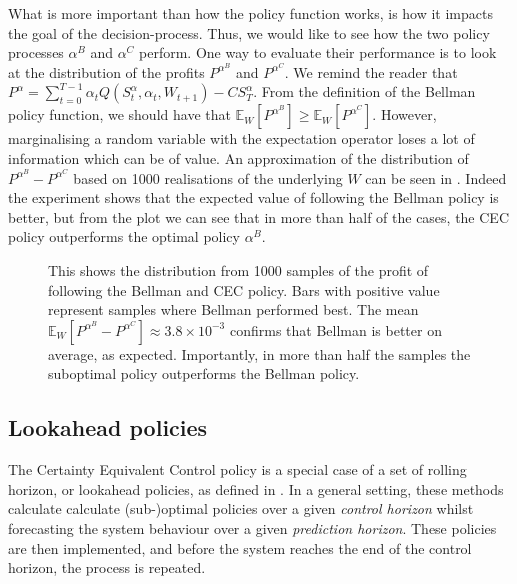 \documentclass[main.tex]{subfiles}
\begin{document}
What is more important than how the policy function works, is how it
impacts the goal of the decision-process. Thus, we would like to see
how the two policy processes $\alpha^B$ and $\alpha^C$ perform.
One way to evaluate their performance is to look at
the distribution of the profits $P^{\alpha^B}$ and $P^{\alpha^C}$.
We remind the reader that
$P^\alpha =
\sum_{t=0}^{T-1}\alpha_tQ(S_t^\alpha,\alpha_t,W_{t+1})-CS_T^\alpha$.
From the definition of the Bellman policy function, we should have
that $\mathbb E_W[P^{\alpha^B}]\geq \mathbb E_W[P^{\alpha^C}]$.
However, marginalising a random variable with the expectation operator
loses a lot of information which can be of value.
An approximation of the distribution of
$P^{\alpha^B}-P^{\alpha^C}$ based on 1000 realisations of the
underlying $W$ can be seen in .
Indeed the experiment shows that the expected value of following the
Bellman policy is better, but from the plot we can see that
in more than half of the cases, the CEC policy outperforms the optimal
policy $\alpha^B$.
\begin{figure}[htbp]
  \centering
  \caption{This shows the distribution from 1000 samples of
    the profit of following the Bellman and CEC policy. Bars with
    positive value represent samples where Bellman performed best.
    The mean $\mathbb E_W[P^{\alpha^B}-P^{\alpha^C}]\approx 3.8\times
    10^{-3}$ confirms that Bellman is better on average, as expected.
    Importantly, in more than half the samples the suboptimal policy
    outperforms the Bellman policy.
  }\label{fig:bellman_det_vals}
\end{figure}

\subsection{Lookahead policies}
The Certainty Equivalent Control policy is a special case of
a set of rolling horizon, or lookahead policies, as defined in
\citep[Ch.~6]{powell2011approximate}.
In a general setting, these methods
calculate calculate (sub-)optimal policies over a given \emph{control
horizon} whilst forecasting the system behaviour over a given
\emph{prediction horizon}.
These policies are then implemented, and before the system reaches the
end of the control horizon, the process is repeated.
\end{document}
